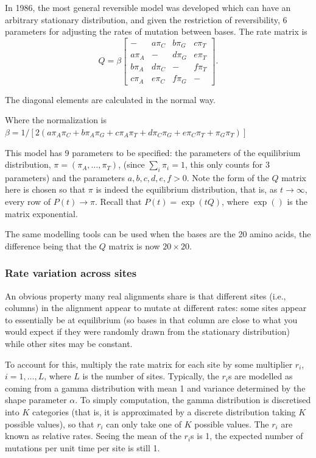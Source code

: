 \documentclass[11pt]{article}
\begin{document}
In 1986, the most general reversible model was developed which can have an arbitrary stationary distribution, and given the restriction of reversibility, 6 parameters for adjusting the rates of mutation between bases.  The rate matrix is 
 \[ \renewcommand{\arraystretch}{1.25}
Q = \beta \left[  \begin{array}{cccc}
- & a\pi_C & b\pi_G & c\pi_T \\
a \pi_A  & - & d\pi_G & e\pi_T \\
b \pi_A &  d\pi_C & - & f\pi_T\\
c \pi_A &  e\pi_C & f\pi_G & -
 \end{array} \right].\] 
 
    The diagonal elements are calculated in the normal way.  
 
 Where the normalization is $\beta = 1/[2(a\pi_A\pi_C+b\pi_A\pi_G+c\pi_A\pi_T+d\pi_C\pi_G+e\pi_C\pi_T+\pi_G\pi_T)]$

    
This model has 9 parameters to be specified: the parameters of the equilibrium distribution,
  $\pi = (\pi_A,\ldots,\pi_T)$,  (since $\sum_i \pi_i = 1$, this only counts for 3 parameters) and the parameters $a,b,c,d,e,f > 0$.
    Note the form of the $Q$ matrix here is chosen so that $\pi$ is indeed the equilibrium distribution, that is, as $t \rightarrow \infty $, every row of $P(t) \rightarrow \pi $.  
    Recall that $P(t) = \exp( t Q )$, where $\exp()$ is the matrix exponential.   
 
The same modelling tools can be used when the bases are the 20 amino acids, the difference being that the $Q$ matrix is now $20\times20$.



\subsubsection{Rate variation across sites}

An obvious property many  real alignments share is that different sites (i.e., columns) in the alignment appear to mutate at different rates: some sites appear to essentially be at equilibrium (so bases in that column are close to what you would expect if they were randomly drawn from the stationary distribution) while other sites may be constant.  

To account for this, multiply the rate matrix for each site by some multiplier $r_i$, $i = 1,\ldots, L$, where $L$ is the number of sites.  Typically, the $r_i$s are modelled as coming from a gamma distribution with mean 1 and variance determined by the shape parameter $\alpha$.  To simply computation, the gamma distribution is discretised into $K$ categories (that is, it is approximated by a discrete distribution taking $K$ possible values), so that $r_i$ can only take one of $K$ possible values.  The $r_i$ are known as relative rates.  Seeing the mean of the $r_i$s is 1, the expected number of mutations per unit time per site is still 1.
\end{document}
